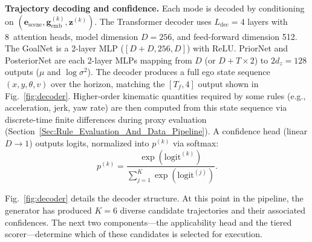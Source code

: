 \textbf{Trajectory decoding and confidence.}
Each mode is decoded by conditioning on $(\mathbf{e}_{\text{scene}},\mathbf{g}_{\text{emb}}^{(k)},\mathbf{z}^{(k)})$. The Transformer decoder uses $L_\text{dec}{=}4$ layers with 8~attention heads, model dimension $D{=}256$, and feed-forward dimension 512. The GoalNet is a 2-layer MLP ($[D{+}D, 256, D]$) with ReLU. PriorNet and PosteriorNet are each 2-layer MLPs mapping from $D$ (or $D{+}T{\times}2$) to $2d_z{=}128$ outputs ($\mu$ and $\log\sigma^2$). The decoder produces a full ego state sequence $(x,y,\theta,v)$ over the horizon, matching the $[T_f,4]$ output shown in Fig.~\ref{fig:decoder}.  Higher-order kinematic quantities required by some rules (e.g., acceleration, jerk, yaw rate) are then computed from this state sequence via discrete-time finite differences during proxy evaluation (Section~\ref{Sec:Rule_Evaluation_And_Data_Pipeline}). A confidence head (linear $D{\to}1$) outputs logits, normalized into $p^{(k)}$ via softmax:
\begin{equation}
p^{(k)}=\frac{\exp(\text{logit}^{(k)})}{\sum_{j=1}^{K}\exp(\text{logit}^{(j)})}.
\end{equation}

Fig.~\ref{fig:decoder} details the decoder structure.  At this point in the pipeline, the generator has produced $K{=}6$ diverse candidate trajectories and their associated confidences.  The next two components---the applicability head and the tiered scorer---determine which of these candidates is selected for execution.

